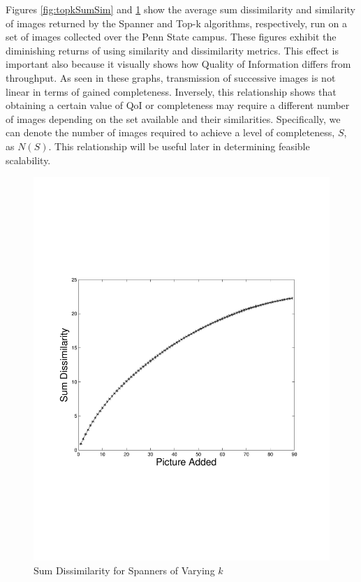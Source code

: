 Figures \ref{fig:topkSumSim} and \ref{fig:spanSumDissim} show the average sum dissimilarity and similarity of images returned by the Spanner and Top-k algorithms, respectively, run on a set of images collected over the Penn State campus.  These figures exhibit the diminishing returns of using similarity and dissimilarity metrics.  This effect is important also because it visually shows how Quality of Information differs from throughput.  As seen in these graphs, transmission of successive images is not linear in terms of gained completeness.  Inversely, this relationship shows that obtaining a certain value of QoI or completeness may require a different number of images depending on the set available and their similarities.  Specifically, we can denote the number of images required to achieve a level of completeness, $S$, as $N(S)$.  This relationship will be useful later in determining feasible scalability.

\begin{figure} 
\begin{centering}
    \includegraphics[trim = 0mm 70mm 0mm 70mm, scale=0.40]{figures/spanner/spannerCumulativeDist.pdf}
    \caption{Sum Dissimilarity for Spanners of Varying $k$}
    \label{fig:spanSumDissim}
\end{centering}
\end{figure}

